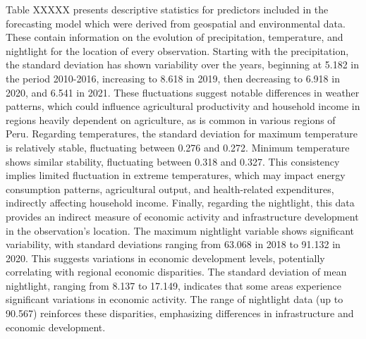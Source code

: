 
Table XXXXX presents descriptive statistics for predictors included in the forecasting model which were derived from geospatial and environmental data. These contain information on the evolution of precipitation, temperature, and nightlight for the location of every observation.
Starting with the precipitation, the standard deviation has shown variability over the years, beginning at 5.182 in the period 2010-2016, increasing to 8.618 in 2019, then decreasing to 6.918 in 2020, and 6.541 in 2021. These fluctuations suggest notable differences in weather patterns, which could influence agricultural productivity and household income in regions heavily dependent on agriculture, as is common in various regions of Peru.
Regarding temperatures, the standard deviation for maximum temperature is relatively stable, fluctuating between 0.276 and 0.272. Minimum temperature shows similar stability, fluctuating between 0.318 and 0.327. This consistency implies limited fluctuation in extreme temperatures, which may impact energy consumption patterns, agricultural output, and health-related expenditures, indirectly affecting household income.
Finally, regarding the nightlight, this data provides an indirect measure of economic activity and infrastructure development in the observation’s location. The maximum nightlight variable shows significant variability, with standard deviations ranging from 63.068 in 2018 to 91.132 in 2020. This suggests variations in economic development levels, potentially correlating with regional economic disparities. The standard deviation of mean nightlight, ranging from 8.137 to 17.149, indicates that some areas experience significant variations in economic activity. The range of nightlight data (up to 90.567) reinforces these disparities, emphasizing differences in infrastructure and economic development.


